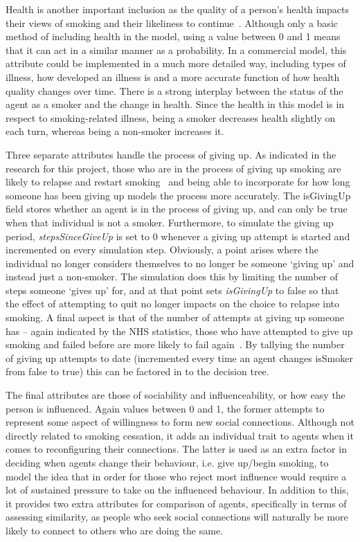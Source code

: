 \documentclass[]{report}
\begin{document}
Health is another important inclusion as the quality of a person's health impacts their views of smoking and their likeliness to continue~\cite{NHS-43}. Although only a basic method of including health in the model, using a value between 0 and 1 means that it can act in a similar manner as a probability. In a commercial model, this attribute could be implemented in a much more detailed way, including types of illness, how developed an illness is and a more accurate function of how health quality changes over time. There is a strong interplay between the status of the agent as a smoker and the change in health. Since the health in this model is in respect to smoking-related illness, being a smoker decreases health slightly on each turn, whereas being a non-smoker increases it.

Three separate attributes handle the process of giving up. As indicated in the research for this project, those who are in the process of giving up smoking are likely to relapse and restart smoking~\cite{NHS-44} and being able to incorporate for how long someone has been giving up models the process more accurately. The isGivingUp field stores whether an agent is in the process of giving up, and can only be true when that individual is not a smoker. Furthermore, to simulate the giving up period, \emph{stepsSinceGiveUp} is set to 0 whenever a giving up attempt is started and incremented on every simulation step. Obviously, a point arises where the individual no longer considers themselves to no longer be someone `giving up' and instead just a non-smoker. The simulation does this by limiting the number of steps someone `gives up' for, and at that point sets \emph{isGivingUp} to false so that the effect of attempting to quit no longer impacts on the choice to relapse into smoking. A final aspect is that of the number of attempts at giving up someone has – again indicated by the NHS statistics, those who have attempted to give up smoking and failed before are more likely to fail again~\cite{NHS-44}. By tallying the number of giving up attempts to date (incremented every time an agent changes isSmoker from false to true) this can be factored in to the decision tree.

The final attributes are those of sociability and influenceability, or how easy the person is influenced. Again values between 0 and 1, the former attempts to represent some aspect of willingness to form new social connections. Although not directly related to smoking cessation, it adds an individual trait to agents when it comes to reconfiguring their connections. The latter is used as an extra factor in deciding when agents change their behaviour, i.e. give up/begin smoking, to model the idea that in order for those who reject most influence would require a lot of sustained pressure to take on the influenced behaviour. In addition to this, it provides two extra attributes for comparison of agents, specifically in terms of assessing similarity, as people who seek social connections will naturally be more likely to connect to others who are doing the same.
\end{document}
